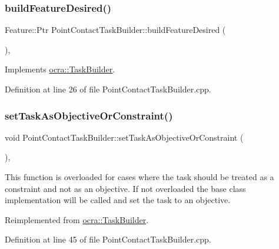 \subsubsection{\texorpdfstring{build\+Feature\+Desired()}{buildFeatureDesired()}}
{\footnotesize\ttfamily Feature\+::\+Ptr Point\+Contact\+Task\+Builder\+::build\+Feature\+Desired (\begin{DoxyParamCaption}{ }\end{DoxyParamCaption})\hspace{0.3cm}{\ttfamily [protected]}, {\ttfamily [virtual]}}



Implements \hyperlink{classocra_1_1TaskBuilder_a7a2c8bcc5d95160d0e48806a2648f1a5}{ocra\+::\+Task\+Builder}.



Definition at line 26 of file Point\+Contact\+Task\+Builder.\+cpp.

\hypertarget{classocra_1_1PointContactTaskBuilder_a729f50dc73c00accb86a9480cb3054fd}{}\label{classocra_1_1PointContactTaskBuilder_a729f50dc73c00accb86a9480cb3054fd} 
\subsubsection{\texorpdfstring{set\+Task\+As\+Objective\+Or\+Constraint()}{setTaskAsObjectiveOrConstraint()}}
{\footnotesize\ttfamily void Point\+Contact\+Task\+Builder\+::set\+Task\+As\+Objective\+Or\+Constraint (\begin{DoxyParamCaption}{ }\end{DoxyParamCaption})\hspace{0.3cm}{\ttfamily [protected]}, {\ttfamily [virtual]}}

This function is overloaded for cases where the task should be treated as a constraint and not as an objective. If not overloaded the base class implementation will be called and set the task to an objective. 

Reimplemented from \hyperlink{classocra_1_1TaskBuilder_a9e7588983e3adf7f706d122a75e84d05}{ocra\+::\+Task\+Builder}.



Definition at line 45 of file Point\+Contact\+Task\+Builder.\+cpp.

